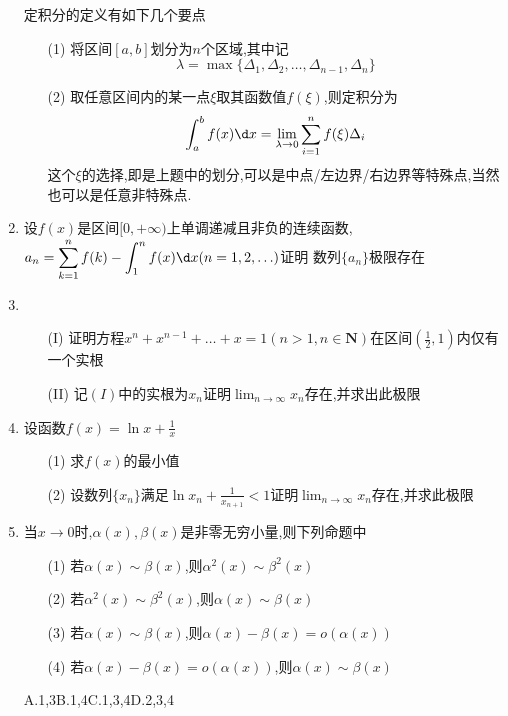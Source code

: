 \documentclass[12pt, a4paper, oneside, UTF8]{ctexbook}
\begin{document}
\begin{enumerate}
{        \newpage
        \begin{remark}[定积分的定义]
            定积分的定义有如下几个要点
            \begin{enumerate}
                \item [(1)] 将区间$[a,b]$划分为$n$个区域,其中记
                $$
                \lambda = \max\{\Delta_1,\Delta_2,\ldots,\Delta_{n-1},\Delta_{n}\}
                $$
                \item [(2)] 取任意区间内的某一点$\xi$取其函数值$f(\xi)$,则定积分为
                $$
                \int_{a}^{b}f(x)\d x = \lim_{\lambda\to 0}\sum_{i=1}^{n}f(\xi)\Delta_{i} 
                $$
                这个$\xi$的选择,即是上题中的划分,可以是中点/左边界/右边界等特殊点,当然也可以是任意非特殊点.
            \end{enumerate}
        \end{remark}
    }
    \item  设$f(x)$是区间$[0,+\infty)$上单调递减且非负的连续函数,$\displaystyle a_n=\sum_{k=1}^{n}f(k)-\int_{1}^{n}f(x)\d x(n=1,2,\ldots)$证明
    数列$\{a_n\}$极限存在 

    \answer{
        \begin{solution}
            
        \end{solution}
    }
    \item 
    \begin{enumerate}
        \item [(I)] 证明方程$x^{n}+x^{n-1}+\ldots+x=1(n>1,n\in\mathbf{N})$在区间$\left(\frac{1}{2},1\right)$内仅有一个实根 
        \item [(II)] 记$(I)$中的实根为$x_n$证明$\displaystyle \lim_{n\to\infty}x_n$存在,并求出此极限 
    \end{enumerate}

    \item 设函数$f(x)=\ln{x}+\frac{1}{x}$ 
    \begin{enumerate}
        \item [(1)] 求$f(x)$的最小值 
        \item [(2)] 设数列$\{x_n\}$满足$\ln{x_n}+\frac{1}{x_{n+1}}<1$证明$\displaystyle\lim_{n\to\infty}x_n$存在,并求此极限
    \end{enumerate}

    \item  当$x\to 0$时,$\alpha(x),\beta(x)$是非零无穷小量,则下列命题中 
    \begin{enumerate}
        \item [(1)] 若$\alpha(x)\sim\beta(x)$,则$\alpha^2(x)\sim\beta^2(x)$ 
        \item [(2)] 若$\alpha^2(x)\sim\beta^2(x)$,则$\alpha(x)\sim\beta(x)$
        \item [(3)] 若$\alpha(x)\sim\beta(x)$,则$\alpha(x)-\beta(x)=o(\alpha(x))$
        \item [(4)] 若$\alpha(x)-\beta(x)=o(\alpha(x))$,则$\alpha(x)\sim\beta(x)$
    \end{enumerate}
    A.1,3\qquad B.1,4\qquad C.1,3,4\qquad D.2,3,4 


\end{enumerate}
\end{document}
